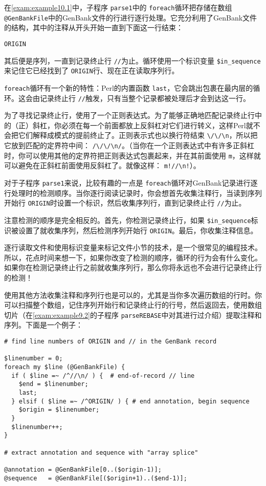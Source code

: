 在\autoref{exam:example10.1}中，子程序 \verb|parse1|中的 \verb|foreach|循环把存储在数组 \verb|@GenBankFile|中的GenBank文件的行进行逐行处理。它充分利用了GenBank文件的结构，其中的注释从开头开始一直到下面这一行结束：

 \verb|ORIGIN|

其后便是序列，一直到记录终止行 \verb|//|为止。循环使用一个标识变量 \verb|$in_sequence|来记住它已经找到了 \verb|ORIGIN|行、现在正在读取序列行。

 \verb|foreach|循环有一个新的特性：Perl的内置函数 \verb|last|，它会跳出包裹在最内层的循环。这会由记录终止行 \verb|//|触发，只有当整个记录都被处理后才会到达这一行。

为了寻找记录终止行，使用了一个正则表达式。为了能够正确地匹配记录终止行中的（正）斜杠，你必须在每一个前面都放上反斜杠对它们进行转义，这样Perl就不会把它们解释成模式的提前终止了。正则表示式也以换行符结束 \verb|\/\/\n|，所以把它放到匹配的定界符中间： \verb|/\/\/\n/|。（当你在一个正则表达式中有许多正斜杠时，你可以使用其他的定界符把正则表达式包裹起来，并在其前面使用 \verb|m|，这样就可以避免在正斜杠前面使用反斜杠了。就像这样： \verb|m!//\n!|）。

对于子程序 \verb|parse1|来说，比较有趣的一点是 \verb|foreach|循环对GenBank记录进行逐行处理时的检测顺序。当你逐行阅读记录时，你会想首先收集注释行，当读到序列开始行 \verb|ORIGIN|时设置一个标识，然后收集序列行，直到记录终止行 \verb|//|为止。

注意检测的顺序是完全相反的。首先，你检测记录终止行，如果 \verb|$in_sequence|标识被设置了就收集序列，然后检测序列开始行 \verb|ORIGIN|。最后，你收集注释信息。

逐行读取文件和使用标识变量来标记文件小节的技术，是一个很常见的编程技术。所以，花点时间来想一下，如果你改变了检测的顺序，循环的行为会有什么变化。如果你在检测记录终止行之前就收集序列行，那么你将永远也不会进行记录终止行的检测！

使用其他方法收集注释和序列行也是可以的，尤其是当你多次遍历数组的行时。你可以扫描整个数组，记住序列开始行和记录终止行的行号，然后返回去，使用数组切片（在\autoref{exam:example9.2}的子程序 \verb|parseREBASE|中对其进行过介绍）提取注释和序列。下面是一个例子：

\begin{lstlisting}
# find line numbers of ORIGIN and // in the GenBank record

$linenumber = 0;
foreach my $line (@GenBankFile) {
  if ( $line =~ /^//\n/ ) {  # end-of-record // line
    $end = $linenumber;
    last;
  } elsif ( $line =~ /^ORIGIN/ ) { # end annotation, begin sequence
    $origin = $linenumber;
  }
  $linenumber++;
}

# extract annotation and sequence with "array splice"

@annotation = @GenBankFile[0..($origin-1)];
@sequence   = @GenBankFile[($origin+1)..($end-1)];
\end{lstlisting}

